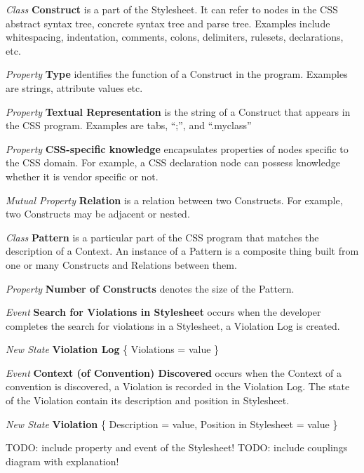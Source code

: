 \documentclass[parskip=full]{uvamscse}
\begin{document}
\begin{description}
\item\textit{Class} \textbf{Construct} is a part of the Stylesheet. It can refer to nodes in the CSS abstract syntax tree, concrete syntax tree and parse tree. Examples include whitespacing, indentation, comments, colons, delimiters, rulesets, declarations, etc.

\textit{Property} \textbf{Type} identifies the function of a Construct in the program. Examples are strings, attribute values etc.

\textit{Property} \textbf{Textual Representation} is the string of a Construct that appears in the CSS program. Examples are tabs, ``;'', and ``.myclass''

\textit{Property} \textbf{CSS-specific knowledge} encapsulates properties of nodes specific to the CSS domain. For example, a CSS declaration node can possess knowledge whether it is vendor specific or not.

\textit{Mutual Property} \textbf{Relation} is a relation between two Constructs. For example, two Constructs may be adjacent or nested.


\item\textit{Class} \textbf{Pattern} is a particular part of the CSS program that matches the description of a Context. An instance of a Pattern is a composite thing built from one or many Constructs and Relations between them.

\textit{Property} \textbf{Number of Constructs} denotes the size of the Pattern.


\item\textit{Event} \textbf{Search for Violations in Stylesheet} occurs when the developer completes the search for violations in a Stylesheet, a Violation Log is created.

\textit{New State} \textbf{Violation Log} \{ Violations = value \}


\item\textit{Event} \textbf{Context (of Convention) Discovered} occurs when the Context of a convention is discovered, a Violation is recorded in the Violation Log. The state of the Violation contain its description and position in Stylesheet.

\textit{New State} \textbf{Violation} \{ Description = value, Position in Stylesheet = value \}

\end{description}

TODO: include property and event of the Stylesheet!
TODO: include couplings diagram with explanation!
\end{document}
